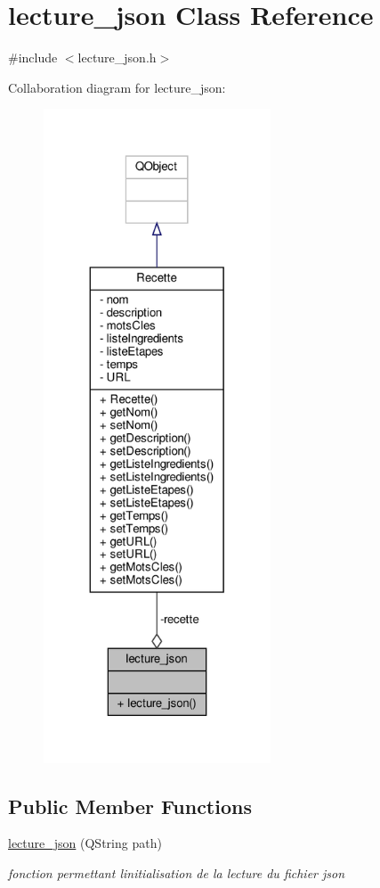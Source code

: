 \hypertarget{classlecture__json}{}\section{lecture\+\_\+json Class Reference}
\label{classlecture__json}


{\ttfamily \#include $<$lecture\+\_\+json.\+h$>$}



Collaboration diagram for lecture\+\_\+json\+:
\nopagebreak
\begin{figure}[H]
\begin{center}
\leavevmode
\includegraphics[height=550pt]{classlecture__json__coll__graph}
\end{center}
\end{figure}
\subsection*{Public Member Functions}
\begin{DoxyCompactItemize}
\item 
\hyperlink{classlecture__json_aa20851b2c129e7edad98c77302201ae1}{lecture\+\_\+json} (Q\+String path)
\begin{DoxyCompactList}\small\item\em fonction permettant l\textquotesingle{}initialisation de la lecture du fichier json \end{DoxyCompactList}\end{DoxyCompactItemize}
